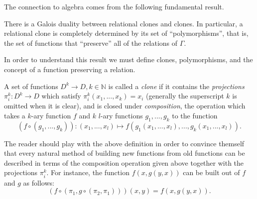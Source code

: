 \documentclass[letterpaper,11pt]{article}
\begin{document}
The connection to algebra comes from the following fundamental result.

\begin{thm} There is a Galois duality between relational clones and clones. In particular, a relational clone is completely determined by its set of ``polymorphisms'', that is, the set of functions that ``preserve'' all of the relations of $\Gamma$.
\end{thm}

In order to understand this result we must define clones, polymorphisms, and the concept of a function preserving a relation.

\begin{defn} A set of functions $D^k \rightarrow D, k \in \mathbb{N}$ is called a \emph{clone} if it contains the \emph{projections} $\pi_i^k : D^k \rightarrow D$ which satisfy $\pi_i^k(x_1, ..., x_k) = x_i$ (generally the superscript $k$ is omitted when it is clear), and is closed under \emph{composition}, the operation which takes a $k$-ary function $f$ and $k$ $l$-ary functions $g_1, ..., g_k$ to the function
\[
(f\circ (g_1, ..., g_k)) : (x_1, ..., x_{l}) \mapsto f(g_1(x_1, ..., x_l), ..., g_k(x_{1}, ..., x_{l})).
\]
\end{defn}

The reader should play with the above definition in order to convince themself that every natural method of building new functions from old functions can be described in terms of the composition operation given above together with the projections $\pi_i^k$. For instance, the function $f(x,g(y,x))$ can be built out of $f$ and $g$ as follows:
\[
(f\circ (\pi_1, g\circ (\pi_2, \pi_1)))(x,y) = f(x,g(y,x)).
\]
\end{document}
